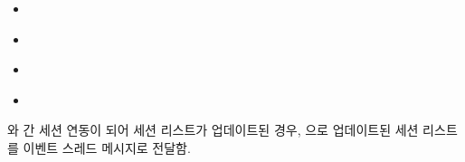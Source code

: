\documentclass[a4paper,10pt,english]{sphinxmanual}
\begin{document}
\begin{fulllineitems}
\begin{fulllineitems}
\begin{quote}
\begin{description}
\begin{itemize}
\end{itemize}

\end{description}\end{quote}


\nopagebreak

\begin{itemize}
\item {} 
\sphinxAtStartPar
{\hyperref[\detokenize{_DHDaemon:DHDaemon._smInit}]{}}

\item {} 
\sphinxAtStartPar
{\hyperref[\detokenize{_DHDaemon:DHDaemon._smUpdateInterestTopic}]{}}

\item {} 
\sphinxAtStartPar
{\hyperref[\detokenize{_DHDaemon:DHDaemon._smUpdateNegotiation}]{}}

\item {} 
\sphinxAtStartPar
{\hyperref[\detokenize{_DHDaemon:DHDaemon._smSyncOn}]{}}

\end{itemize}



\end{fulllineitems}


\begin{fulllineitems}
\label{\detokenize{_SessionManager:SessionManager._dmGetSessionListInfo}}
\pysigstartsignatures
{}
\pysigstopsignatures
\sphinxAtStartPar
{\hyperref[\detokenize{_SessionRequester:sessionrequester}]{}} 와 {\hyperref[\detokenize{_SessionListener:sessionlistener}]{}} 간 세션 연동이 되어 세션 리스트가 업데이트된 경우,
{\hyperref[\detokenize{_DHDaemon:dhdaemon}]{}} 으로 업데이트된 세션 리스트를  이벤트 스레드 메시지로 전달함.



\end{fulllineitems}
\end{fulllineitems}
\end{document}
